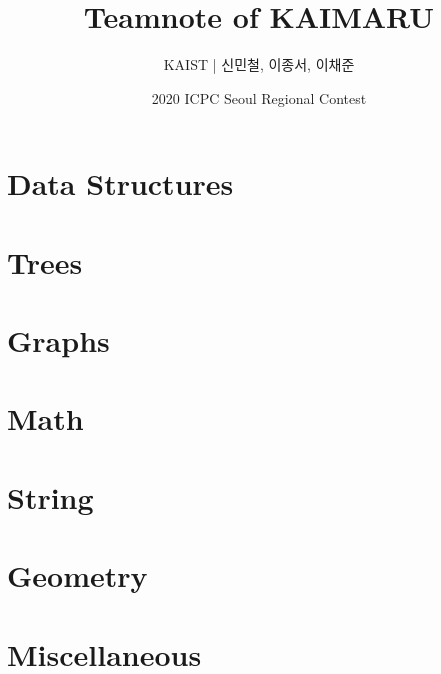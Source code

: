\documentclass[10pt,landscape,a4paper]{article}
\title{ \bf \sf \fontsize{80}{80}\selectfont Teamnote of KAIMARU}
\author{\sf \huge KAIST | 신민철, 이종서, 이채준}
\date{\sf \Large 2020 ICPC Seoul Regional Contest}
\newenvironment{cpp}
  {\VerbatimEnvironment
   \begin{verbatim}}
  {\end{verbatim}}
\begin{document}
\begin{multicols}{2}



\maketitle


\section{Data Structures}


\section{Trees}


\section{Graphs}


\section{Math}


\section{String}


\section{Geometry}


\section{Miscellaneous}

\iffalse
\subsection{References}
\begin{cpp}
/*
https://github.com/koosaga/olympiad/tree/master/Library
https://github.com/jh05013/icpc-teamnote/blob/master/main.tex //template
https://github.com/hongjun7/Competitive-Programming/blob/master/
https://github.com/ntopia/icpc-teamnote/tree/master/src
https://github.com/justiceHui/AlgorithmImplement/
https://github.com/kth-competitive-programming/kactl
https://zigui.tistory.com/
https://cp-algorithms.com/dynamic_programming/divide-and-conquer-dp.html
https://cubelover.tistory.com
*/
\end{cpp}
\fi
\end{multicols}
\end{document}
